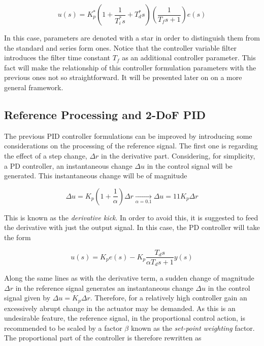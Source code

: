 \begin{itemize}
\begin{equation}
	u(s) =  K^*_p \left(1+ \frac{1}{T^*_i s} + T^*_d s  \right) \left(\frac{1}{T_f s+1}\right) e(s)	
\end{equation} 

In this case, parameters are denoted with a star in order to distinguish them from the standard and series form ones. Notice that the controller variable filter introduces the filter time constant $T_f$ as an additional controller parameter. This fact will make the relationship of this controller formulation parameters with the previous ones not so straightforward. It will be presented later on on a more general framework. 
\end{itemize}


\subsection{Reference Processing and 2-DoF PID}
\label{sec:3.2}

The previous PID controller formulations can be improved by introducing some considerations on the processing of the reference signal. The first one is regarding the effect of a step change, $\Delta r$ in the derivative part. Considering, for simplicity, a PD controller, an instantaneous change $\Delta u$ in the control signal will be generated. This instantaneous change will be of magnitude

\begin{equation}
\Delta u = K_p \left ( 1 +\frac{1}{\alpha} \right ) \Delta r \xrightarrow[\alpha=0.1]{}\Delta u = 11 K_p \Delta r
\end{equation} 

This is known as the \emph{derivative kick}. In order to avoid this, it is suggested to feed the derivative with just the output signal.  In this case, the PD controller will take the form

\begin{equation}
u(s)=K_p e(s) - K_p\frac{T_ds}{\alpha T_d s+1} y(s)
\end{equation}

Along the same lines as with the derivative term, a sudden change of magnitude $\Delta r$ in the reference signal generates an instantaneous change $\Delta u$ in the control signal given by $\Delta u = K_p \Delta r$. Therefore, for a relatively high controller gain an excessively abrupt change in the actuator may be demanded. As this is an undesirable feature, the reference signal, in the proportional control action, is recommended to be scaled by a factor $\beta$ known as the \emph{set-point weighting} factor.  The proportional part of the controller is therefore rewritten as


